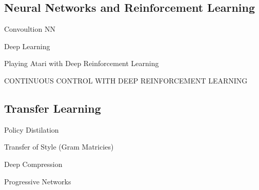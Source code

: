 \documentclass[paper=a4, fontsize=11pt]{scrartcl} %
\begin{document}
	\subsection{Neural Networks and Reinforcement Learning}
		Convoultion NN

		Deep Learning \cite{LeCun2015}

		Playing Atari with Deep Reinforcement Learning~\cite{Mnih2013}

		CONTINUOUS CONTROL WITH DEEP REINFORCEMENT LEARNING~\cite{Lillicrap2015}

	\subsection{Transfer Learning}
		Policy Distilation~\cite{Rusu2015}

		Transfer of Style (Gram Matricies)~\cite{Gatys2015}
		
		Deep Compression~\cite{Han2015}

		Progressive Networks


\end{document}
